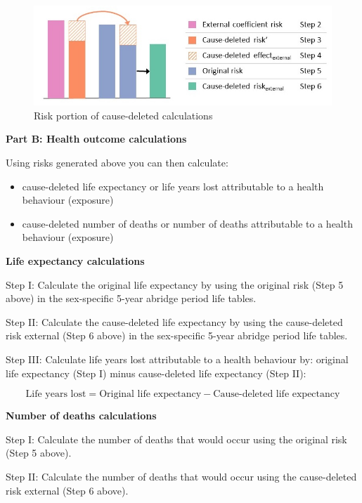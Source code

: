 \documentclass[]{book}
\providecommand{\tightlist}{%
  \setlength{\itemsep}{0pt}\setlength{\parskip}{0pt}}
\begin{document}
\begin{figure}

{\centering \includegraphics{Method2 only -cbf} 

}

\caption{Risk portion of cause-deleted calculations}\label{fig:unnamed-chunk-5}
\end{figure}

\textbf{Part B: Health outcome calculations}

Using risks generated above you can then calculate:

\begin{itemize}
\tightlist
\item
  cause-deleted life expectancy or life years lost attributable to a
  health behaviour (exposure)
\item
  cause-deleted number of deaths or number of deaths attributable to a
  health behaviour (exposure)
\end{itemize}

\textbf{Life expectancy calculations}

Step I: Calculate the original life expectancy by using the original
risk (Step 5 above) in the sex-specific 5-year abridge period life
tables.

Step II: Calculate the cause-deleted life expectancy by using the
cause-deleted risk external (Step 6 above) in the sex-specific 5-year
abridge period life tables.

Step III: Calculate life years lost attributable to a health behaviour
by: original life expectancy (Step I) minus cause-deleted life
expectancy (Step II):

\[ \text{Life years lost} = \text{Original life expectancy} - \text{Cause-deleted life expectancy}\]

\textbf{Number of deaths calculations}

Step I: Calculate the number of deaths that would occur using the
original risk (Step 5 above).

Step II: Calculate the number of deaths that would occur using the
cause-deleted risk external (Step 6 above).
\end{document}
